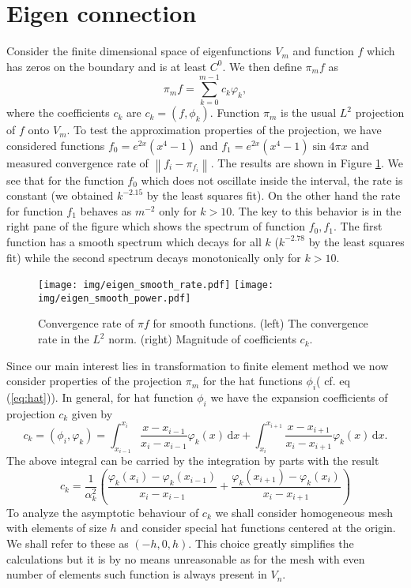 \documentclass[a4paper,10pt]{article}
\newcommand{\norm}[1]{\ensuremath{\left\|#1\right\|}}
\newcommand{\inner}[2]{\ensuremath{\left(#1, #2\right)}}
\newcommand{\meas}[1]{\ensuremath{\,\mathrm{d}#1}}
\begin{document}
  \section{Eigen connection}
  Consider the finite dimensional space of eigenfunctions $V_m$ and function $f$
  which has zeros on the boundary and is at least $C^0$. We then define $\pi_m f$
  as
  \[
    \pi_m f = \displaystyle\sum\limits_{k=0}^{m-1}c_k \varphi_k,
  \]
  where the coefficients $c_k$ are $c_k=\inner{f}{\phi_k}$. Function $\pi_m$ is
  the usual $L^2$ projection of $f$ onto $V_m$. To test the approximation
  properties of the projection, we have considered functions
  $f_0=e^{2x}(x^4-1)$ and $f_1=e^{2x}(x^4-1)\sin{4\pi x}$ and measured
  convergence rate of $\norm{f_i - \pi_{f_i}}$. The results are shown in
  Figure \ref{fig:eig_smooth_projection}. We see that for the function $f_0$
  which does not oscillate inside the interval, the rate is constant (we
  obtained $k^{-2.15}$ by the least squares fit). On the other hand the rate
  for function $f_1$ behaves as $m^{-2}$ only for $k>10$. The key to this behavior
  is in the right pane of the figure which shows the spectrum of function $f_0,
  f_1$. The first function has a smooth spectrum which decays for all $k$
  ($k^{-2.78}$ by the least squares fit) while the second spectrum decays
  monotonically only for $k>10$.
  \begin{figure}
  \begin{center}
    \texttt{[image: img/eigen\_smooth\_rate.pdf]}
    \texttt{[image: img/eigen\_smooth\_power.pdf]}
  \end{center}
  \label{fig:eig_smooth_projection}
  \caption{Convergence rate of $\pi f$ for smooth functions. (left) The
  convergence rate in the $L^2$ norm. (right) Magnitude of coefficients $c_k$.}
  \end{figure}

  Since our main interest lies in transformation to finite element method we
  now consider properties of the projection $\pi_m$ for the hat functions
  $\phi_i$( cf. eq (\ref{eq:hat})). In general, for hat function $\phi_i$ we
  have the expansion coefficients of projection $c_k$ given by
  \[
    c_k = \inner{\phi_i}{\varphi_k} =
    \displaystyle\int_{x_{i-1}}^{x_{i}}\frac{x-x_{i-1}}{x_i-x_{i-1}}\varphi_k(x)\meas{x}+
    \displaystyle\int_{x_{i}}^{x_{i+1}}\frac{x-x_{i+1}}{x_i-x_{i+1}}\varphi_k(x)\meas{x}.
  \]
  The above integral can be carried by the integration by parts with the result
  \begin{equation}
    \label{eq:eigen_hat_ck}
    c_k =
    \frac{1}{\alpha_k^2}
    \left(
    \frac{\varphi_k(x_i) - \varphi_k(x_{i-1})}{x_i - x_{i-1}} +
    \frac{\varphi_k(x_{i+1}) - \varphi_k(x_{i})}{x_i - x_{i+1}}
    \right)
  \end{equation}
  To analyze the asymptotic behaviour of $c_k$ we shall consider homogeneous
  mesh with elements of size $h$ and consider special hat functions centered
  at the origin. We shall refer to these as $(-h, 0, h)$. This choice greatly
  simplifies the calculations but it is by no means unreasonable as for the mesh
  with even number of elements such function is always present in $V_n$.
\end{document}
